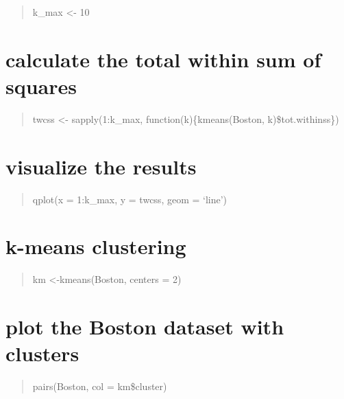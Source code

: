 \documentclass[]{article}
\begin{document}
\begin{quote}
k\_max \textless{}- 10
\end{quote}

\section{calculate the total within sum of
squares}\label{calculate-the-total-within-sum-of-squares}

\begin{quote}
twcss \textless{}- sapply(1:k\_max, function(k)\{kmeans(Boston,
k)\$tot.withinss\})
\end{quote}

\section{visualize the results}\label{visualize-the-results}

\begin{quote}
qplot(x = 1:k\_max, y = twcss, geom = `line')
\end{quote}

\section{k-means clustering}\label{k-means-clustering-1}

\begin{quote}
km \textless{}-kmeans(Boston, centers = 2)
\end{quote}

\section{plot the Boston dataset with
clusters}\label{plot-the-boston-dataset-with-clusters-1}

\begin{quote}
pairs(Boston, col = km\$cluster)
\end{quote}
\end{document}
